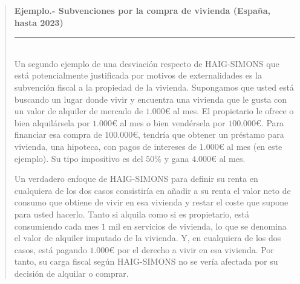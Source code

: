 \documentclass[10pt,a4paper]{article}
\newenvironment{specialblock}[1]{%
      \begin{quote} %
      \small %
      \noindent\textbf{#1}\\[-0.3em] %
      \rule{\linewidth}{0.4pt}\\[0.6em]}{
      \end{quote}}
\begin{document}
\begin{specialblock}{\textbf{Ejemplo.-} Subvenciones por la compra de vivienda (España, hasta 2023)}
    Un segundo ejemplo de una desviación respecto de HAIG-SIMONS que está potencialmente justificada por motivos de externalidades es la subvención fiscal a la propiedad de la vivienda. Supongamos que usted está buscando un lugar donde vivir y encuentra una vivienda que le gusta con un valor de alquiler de mercado de $1.000€$ al mes. El propietario le ofrece o bien alquilársela por $1.000€$ al mes o bien vendérsela por $100.000€$. Para financiar esa compra de $100.000€$, tendría que obtener un préstamo para vivienda, una hipoteca, con pagos de intereses de $1.000€$ al mes (en este ejemplo). Su tipo impositivo es del $50\%$ y gana $4.000€$ al mes.

    Un verdadero enfoque de HAIG-SIMONS para definir su renta en cualquiera de los dos casos consistiría en añadir a su renta el valor neto de consumo que obtiene de vivir en esa vivienda y restar el coste que supone para usted hacerlo. Tanto si alquila como si es propietario, está consumiendo cada mes $1$ mil en servicios de vivienda, lo que se denomina el valor de alquiler imputado de la vivienda. Y, en cualquiera de los dos casos, está pagando $1.000€$ por el derecho a vivir en esa vivienda. Por tanto, su carga fiscal según HAIG-SIMONS no se vería afectada por su decisión de alquilar o comprar.
    

\end{specialblock}
\end{document}

